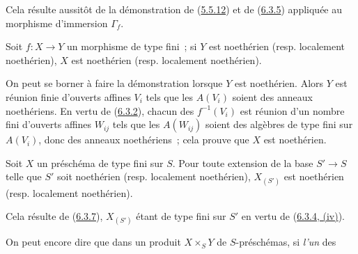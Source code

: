 Cela résulte aussitôt de la démonstration de
(\hyperref[I.5.5.12-fr]{5.5.12}) et de (\hyperref[I.6.3.5-fr]{6.3.5}) appliquée
au morphisme d'immersion $\Gamma_f$.

\begin{proposition}[6.3.7]
\label{I.6.3.7-fr}
Soit $f:X\to Y$ un morphisme de type fini~; si $Y$ est noethérien (resp.
localement noethérien), $X$ est noethérien (resp. localement noethérien).
\end{proposition}

On peut se borner à faire la démonstration lorsque $Y$ est noethérien. Alors $Y$
est réunion finie d'ouverts affines $V_i$ tels que les $A(V_i)$ soient des
anneaux noethériens. En vertu de (\hyperref[I.6.3.2-fr]{6.3.2}), chacun des
$f^{-1}(V_i)$ est réunion d'un nombre fini d'ouverts affines $W_{ij}$ tels que
les $A(W_{ij})$ soient des algèbres de type fini sur $A(V_i)$, donc des anneaux
noethériens~; cela prouve que $X$ est noethérien.

\begin{corollary}[6.3.8]
\label{I.6.3.8-fr}
Soit $X$ un préschéma de type fini sur $S$. Pour toute extension de la base
$S'\to S$ telle que $S'$ soit noethérien (resp. localement noethérien),
$X_{(S')}$ est noethérien (resp. localement noethérien).
\end{corollary}

Cela résulte de (\hyperref[I.6.3.7-fr]{6.3.7}), $X_{(S')}$ étant de type fini
sur $S'$ en vertu de (\hyperref[I.6.3.4-fr]{6.3.4, (iv)}).

On peut encore dire que dans un produit $X\times_S Y$ de $S$-préschémas, si
\emph{l'un} des
